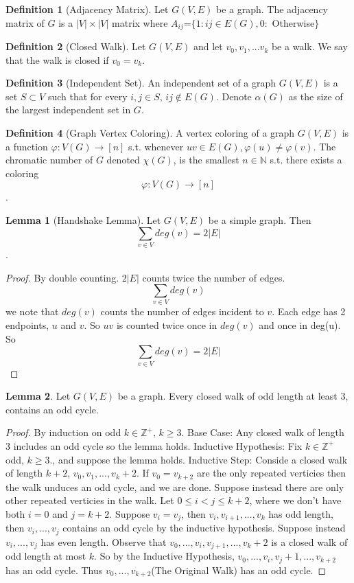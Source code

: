 \documentclass{article}
\theoremstyle{definition}
\newtheorem{define}{Definition}[section]
\newtheorem{lem}{Lemma}[section]
\begin{document}
\begin{define}[Adjacency Matrix]
Let $G(V,E)$ be a graph. The adjacency matrix of $G$ is a $|V| \times |V|$ matrix where $A_{ij}$=$\{1:ij\in E(G), 0:$ Otherwise$\}$
\end{define}

\begin{define}[Closed Walk]
Let $G(V, E)$ and let $v_0, v_1,...v_k$ be a walk. We say that the walk is closed if $v_0 = v_k$.
\end{define}

\begin{define}[Independent Set]
An independent set of a graph $G(V,E)$ is a set $S \subset V$ such that for every $i,j \in S$, $ij \notin E(G)$. Denote $\alpha(G)$ as the size of the largest independent set in $G$.
\end{define}

\begin{define}[Graph Vertex Coloring] 
A vertex coloring of a graph $G(V, E)$ is a function $\varphi : V(G) \rightarrow [n]$ s.t. whenever $uv\in E(G), \varphi(u) \neq \varphi(v)$. The chromatic number of $G$ denoted $\chi(G)$, is the smallest $n \in \mathbb{N}$ s.t. there exists a coloring $$\varphi:V(G)\rightarrow [n]$$. 
\end{define}

\begin{lem}[Handshake Lemma]
Let $G(V, E)$ be a simple graph. Then $$\sum_{v\in V}deg(v) = 2|E|$$.
\end{lem}
\begin{proof} 
By double counting. $2|E|$ counts twice the number of edges. $$\sum_{v\in V}deg(v)$$we note that $deg(v)$ counts the number of edges incident to $v$. Each edge has 2 endpoints, $u$ and $v$. So $uv$ is counted twice once in $deg(v)$ and once in deg(u). So  $$\sum_{v\in V}deg(v) = 2|E|$$
\end{proof}

\begin{lem}
Let $G(V, E)$ be a graph. Every closed walk of odd length at least 3, contains an odd cycle.
\end{lem}
\begin{proof}
By induction on odd $k\in \mathbb{Z}^+$, $k \geq 3$. Base Case: Any closed walk of length 3 includes an odd cycle so the lemma holds. Inductive Hypothesis: Fix $k\in \mathbb{Z}^+$ odd, $k\geq 3$., and suppose the lemma holds. Inductive Step: Conside a closed walk of length $k+2$, $v_0,v_1,...,v_k+2$. If $v_0 = v_{k+2}$ are the only repeated verticies then the walk unduces an odd cycle, and we are done. Suppose instead there are only other repeated verticies in the walk. Let $0 \leq i < j \leq k+2$, where we don't have both $i=0$ and $j=k+2$. Suppose $v_i = v_j$, then $v_i,v_{i+1},...,v_k$ has odd length, then $v_i,...,v_j$ contains an odd cycle by the inductive hypothesis. Suppose instead $v_i,...,v_j$ has even length. Observe that $v_0,...,v_i,v_{j+1},...,v_k+2$ is a closed walk of odd length at most $k$. So by the Inductive Hypothesis, $v_0,...,v_i,v_j+1,...,v_{k+2}$ has an odd cycle. Thus $v_0,...,v_{k+2}$(The Original Walk) has an odd cycle.
\end{proof}
\end{document}
